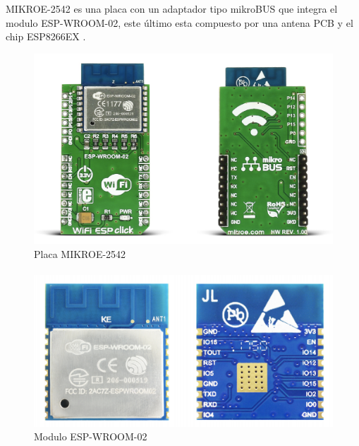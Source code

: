 MIKROE-2542 es una placa con un adaptador tipo mikroBUS que integra el modulo ESP-WROOM-02, este último esta compuesto por una antena PCB y el chip ESP8266EX \citep{MarcoTeorico5}.

\begin{figure}[H]
	\centering
	\includegraphics[scale=.25]{Capitulo2/images/mikroe.png}
	\caption{Placa MIKROE-2542}
	\label{fig:diagrama_dispensador}
\end{figure}
\paragraph{}

\begin{figure}[H]
	\centering
	\includegraphics[scale=.25]{Capitulo2/images/wroom.png}
	\caption{Modulo ESP-WROOM-02}
	\label{fig:diagrama_dispensador}
\end{figure}


